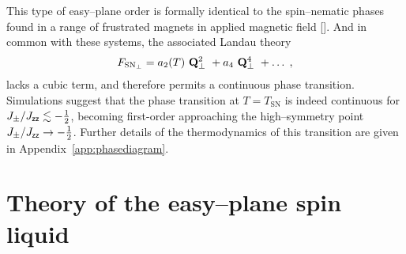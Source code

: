 \documentclass[apsrev4-1,prx,superscriptaddress,floatfix,twocolumn,longbibliography]{revtex4-1}
\begin{document}


This type of easy--plane order is formally 
identical to the spin--nematic 
phases found in a range of frustrated magnets in applied magnetic field 
[].
%
And in common with these systems, the associated Landau theory 
%
\begin{eqnarray}
F_{\text{$\text{SN}_\perp$}} 
   = a_2(T)\  {\bf Q}_\perp^2\ 
    + a_4\  {\bf Q}_\perp^4\  + \ldots  \; , 
\label{eq:mQlandau}
\end{eqnarray}
%
lacks a cubic term, and therefore permits a continuous phase transition.
%
Simulations suggest that the phase transition at $T=T_\text{SN}$ is indeed 
continuous for \mbox{$J_{\pm}/J_{\sf zz} \lesssim -\frac{1}{2}$}, becoming 
first-order approaching the high--symmetry point \mbox{$J_{\pm}/J_{\sf zz} \to -\frac{1}{2}$}.
%
Further details of the thermodynamics of this transition are given in 
Appendix~\ref{app:phasediagram}.

\section{Theory of the easy--plane spin liquid}
\label{sec:SLII}

\end{document}
